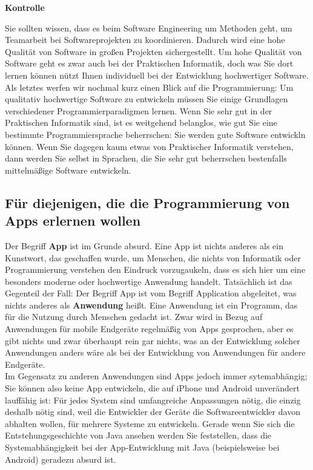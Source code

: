 \textbf{Kontrolle}

Sie sollten wissen, dass es beim Software Engineering um Methoden geht, um Teamarbeit bei Softwareprojekten zu koordinieren. Dadurch wird eine hohe Qualität von Software in großen Projekten sichergestellt. Um hohe Qualität von Software geht es zwar auch bei der Praktischen Informatik, doch was Sie dort lernen können nützt Ihnen individuell bei der Entwicklung hochwertiger Software. Als letztes werfen wir nochmal kurz einen Blick auf die Programmierung: Um qualitativ hochwertige Software zu entwickeln müssen Sie einige Grundlagen verschiedener Programmierparadigmen lernen. Wenn Sie sehr gut in der Praktischen Informatik sind, ist es weitgehend belanglos, wie gut Sie eine bestimmte Programmiersprache beherrschen: Sie werden gute Software entwickln können. Wenn Sie dagegen kaum etwas von Praktischer Informatik verstehen, dann werden Sie selbst in Sprachen, die Sie sehr gut beherrschen bestenfalls mittelmäßige Software entwickeln.

\subsection[App-Entwicklung]{Für diejenigen, die die Programmierung von Apps erlernen wollen}

Der Begriff \textbf{App} ist im Grunde absurd. Eine App ist nichts anderes als ein Kunstwort, das geschaffen wurde, um Menschen, die nichts von Informatik oder Programmierung verstehen den Eindruck vorzugaukeln, dass es sich hier um eine besonders moderne oder hochwertige Anwendung handelt. Tatsächlich ist das Gegenteil der Fall: Der Begriff App ist vom Begriff Application abgeleitet, was nichts anderes als \textbf{Anwendung} heißt. Eine Anwendung ist ein Programm, das für die Nutzung durch Menschen gedacht ist. Zwar wird in Bezug auf Anwendungen für mobile Endgeräte regelmäßig von Apps gesprochen, aber es gibt nichts und zwar überhaupt rein gar nichts, was an der Entwicklung solcher Anwendungen anders wäre als bei der Entwicklung von Anwendungen für andere Endgeräte.\\

Im Gegensatz zu anderen Anwendungen sind Apps jedoch immer sytemabhängig; Sie können also keine App entwickeln, die auf iPhone und Android unverändert lauffähig ist: Für jedes System sind umfangreiche Anpassungen nötig, die einzig deshalb nötig sind, weil die Entwickler der Geräte die Softwareentwickler davon abhalten wollen, für mehrere Systeme zu entwickeln. Gerade wenn Sie sich die Entstehungsgeschichte von Java ansehen werden Sie feststellen, dass die Systemabhängigkeit bei der App-Entwicklung mit Java (beispielsweise bei Android) geradezu absurd ist.\\

